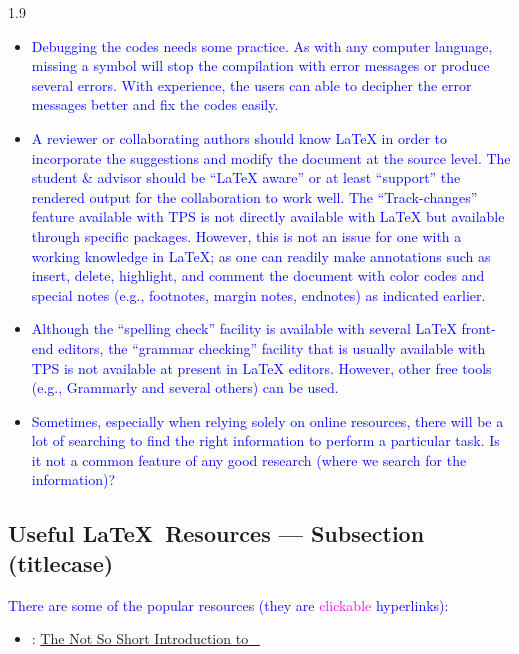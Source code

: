\documentclass[phd]{ndsu-thesis-2022}
\newcommand\myspacing{1.9}      %
\newcommand\italk[1]{\textcolor{blue}{#1}}  %
\newcommand\lx{\LaTeX\xspace}
\begin{document}
\begin{spacing}{\myspacing}
\begin{itemize}[leftmargin=*, itemsep=0pt, parsep=3pt]
\item \italk{Debugging the codes needs some practice. As with any computer language, missing a symbol will stop the compilation with error messages or produce several errors. With experience, the users can able to decipher the error messages better and fix the codes easily.}  

\item \italk{A reviewer or collaborating authors should know \lx in order to incorporate the suggestions and modify the document at the source level. The student \& advisor should be ``\lx aware'' or at least ``support'' the rendered output for the collaboration to work well.  The ``Track-changes'' feature available with TPS is not directly available with \lx but available through specific packages. However, this is not an issue for one with a working knowledge in \lx; as one can readily make annotations such as insert, delete, highlight, and comment the document with color codes and special notes (e.g., footnotes, margin notes, endnotes) as indicated earlier.} 

\item \italk{Although the ``spelling check'' facility is available with several \lx front-end editors, the ``grammar checking'' facility that is usually available with TPS is not available at present in \lx editors. However, other free tools (e.g., Grammarly and several others) can be used.}  

\item \italk{Sometimes, especially when relying solely on online resources, there will be a lot of searching to find the right information to perform a particular task. Is it not a common feature of any good research (where we search for the information)?} 

\end{itemize}

\subsection{Useful \LaTeX\ Resources --- Subsection (titlecase)} 

\italk{There are some of the popular resources (they are \textcolor{magenta}{clickable} hyperlinks):}

\begin{itemize}
\setlength\itemindent{0.25in}
\item \citet{notso2021}:  \textcolor{magenta}{\href{http://tug.ctan.org/info/lshort/english/lshort.pdf}
{The Not So Short Introduction to \LaTeXe\ }}


\end{itemize}
\end{spacing}
\end{document}
